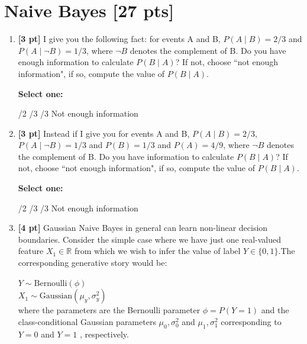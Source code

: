 \documentclass[11pt,addpoints,answers]{exam}
\begin{document}
\section{Naive Bayes [27 pts]}
\begin{enumerate}
    \item \textbf{[3 pt]} I give you the following fact: for events A and B, $P(A\mid B) = 2/3$ and $P(A\mid \neg B) = 1/3$, where $\neg B$ denotes the complement of B. Do you have enough information to calculate $P(B\mid A)$? If not, choose ``not enough information", if so, compute the value of $P(B\mid A)$.

    \textbf{Select one:}
    \begin{checkboxes}
        /2
        /3
        /3
        \choice Not enough information
    \end{checkboxes}
    
    
    \item \textbf{[3 pt]} Instead if I give you for events A and B, $P(A\mid B) = 2/3$, $P(A\mid \neg B) = 1/3$ and $P(B) = 1/3$ and $P(A) = 4/9$, where $\neg B$ denotes the complement of B. Do you have information to calculate $P(B\mid A)$? If not, choose ``not enough information", if so, compute the value of $P(B\mid A)$.

    \textbf{Select one:}
    \begin{checkboxes}
        /2
        /3
        /3
        \choice Not enough information
    \end{checkboxes}
    
    
    \clearpage
    

    
    \clearpage
    
    \item \textbf{[4 pt]} Gaussian Naive Bayes in general can learn non-linear decision boundaries. Consider the simple case where we have just one real-valued feature $X_1\in\mathbb{R}$ from which we wish to infer the value of label $Y\in\{0,1\}$.The corresponding generative story would be:
    
    $Y \sim \text{Bernoulli}(\phi)$\\
    $X_1 \sim \text{Gaussian}(\mu_y, \sigma^2_y)$\\
    where the parameters are the Bernoulli parameter $\phi = P(Y=1)$  and the class-conditional Gaussian parameters $\mu_0, \sigma^2_0$ and $\mu_1, \sigma^2_1$   corresponding to $Y=0$ and $Y=1$ , respectively.


\end{enumerate}
\end{document}
